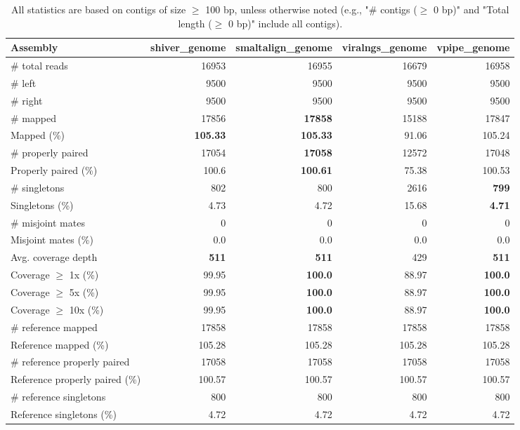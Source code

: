 \documentclass[12pt,a4paper]{article}
\begin{document}
\begin{table}[ht]
\begin{center}
\caption{All statistics are based on contigs of size $\geq$ 100 bp, unless otherwise noted (e.g., "\# contigs ($\geq$ 0 bp)" and "Total length ($\geq$ 0 bp)" include all contigs).}
\begin{tabular}{|l*{4}{|r}|}
\hline
Assembly & shiver\_genome & smaltalign\_genome & viralngs\_genome & vpipe\_genome \\ \hline
\# total reads & 16953 & 16955 & 16679 & 16958 \\ \hline
\# left & 9500 & 9500 & 9500 & 9500 \\ \hline
\# right & 9500 & 9500 & 9500 & 9500 \\ \hline
\# mapped & 17856 & {\bf 17858} & 15188 & 17847 \\ \hline
Mapped (\%) & {\bf 105.33} & {\bf 105.33} & 91.06 & 105.24 \\ \hline
\# properly paired & 17054 & {\bf 17058} & 12572 & 17048 \\ \hline
Properly paired (\%) & 100.6 & {\bf 100.61} & 75.38 & 100.53 \\ \hline
\# singletons & 802 & 800 & 2616 & {\bf 799} \\ \hline
Singletons (\%) & 4.73 & 4.72 & 15.68 & {\bf 4.71} \\ \hline
\# misjoint mates & 0 & 0 & 0 & 0 \\ \hline
Misjoint mates (\%) & 0.0 & 0.0 & 0.0 & 0.0 \\ \hline
Avg. coverage depth & {\bf 511} & {\bf 511} & 429 & {\bf 511} \\ \hline
Coverage $\geq$ 1x (\%) & 99.95 & {\bf 100.0} & 88.97 & {\bf 100.0} \\ \hline
Coverage $\geq$ 5x (\%) & 99.95 & {\bf 100.0} & 88.97 & {\bf 100.0} \\ \hline
Coverage $\geq$ 10x (\%) & 99.95 & {\bf 100.0} & 88.97 & {\bf 100.0} \\ \hline
\# reference mapped & 17858 & 17858 & 17858 & 17858 \\ \hline
Reference mapped (\%) & 105.28 & 105.28 & 105.28 & 105.28 \\ \hline
\# reference properly paired & 17058 & 17058 & 17058 & 17058 \\ \hline
Reference properly paired (\%) & 100.57 & 100.57 & 100.57 & 100.57 \\ \hline
\# reference singletons & 800 & 800 & 800 & 800 \\ \hline
Reference singletons (\%) & 4.72 & 4.72 & 4.72 & 4.72 \\ \hline

\end{tabular}
\end{center}
\end{table}
\end{document}
